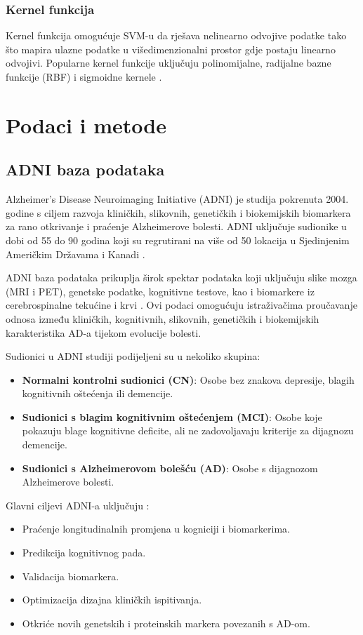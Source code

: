 \documentclass[zavrsnirad,upload]{fer}
\begin{document}
\subsection{Kernel funkcija}
Kernel funkcija omogućuje SVM-u da rješava nelinearno odvojive podatke tako što mapira ulazne podatke u višedimenzionalni prostor gdje postaju linearno odvojivi. Popularne kernel funkcije uključuju polinomijalne, radijalne bazne funkcije (RBF) i sigmoidne kernele \cite{Gammermann2000}.



\chapter{Podaci i metode}
\section{ADNI baza podataka}
Alzheimer's Disease Neuroimaging Initiative (ADNI) je studija pokrenuta 2004. godine s ciljem razvoja kliničkih, slikovnih, genetičkih i biokemijskih biomarkera za rano otkrivanje i praćenje Alzheimerove bolesti. ADNI uključuje sudionike u dobi od 55 do 90 godina koji su regrutirani na više od 50 lokacija u Sjedinjenim Američkim Državama i Kanadi \cite{adni_about}. 

ADNI baza podataka prikuplja širok spektar podataka koji uključuju slike mozga (MRI i PET), genetske podatke, kognitivne testove, kao i biomarkere iz cerebrospinalne tekućine i krvi \cite{adni_about}. Ovi podaci omogućuju istraživačima proučavanje odnosa između kliničkih, kognitivnih, slikovnih, genetičkih i biokemijskih karakteristika AD-a tijekom evolucije bolesti.

Sudionici u ADNI studiji podijeljeni su u nekoliko skupina:

\begin{itemize}
	\item \textbf{Normalni kontrolni sudionici (CN)}: Osobe bez znakova depresije, blagih kognitivnih oštećenja ili demencije.
	\item\textbf{Sudionici s blagim kognitivnim oštećenjem (MCI)}: Osobe koje pokazuju blage kognitivne deficite, ali ne zadovoljavaju kriterije za dijagnozu demencije.
	\item \textbf{Sudionici s Alzheimerovom bolešću (AD)}: Osobe s dijagnozom Alzheimerove bolesti.
\end{itemize}

Glavni ciljevi ADNI-a uključuju \cite{adni_about}:
\begin{itemize}
	\item Praćenje longitudinalnih promjena u kogniciji i biomarkerima.
	\item Predikcija kognitivnog pada.
	\item Validacija biomarkera.
	\item Optimizacija dizajna kliničkih ispitivanja.
	\item Otkriće novih genetskih i proteinskih markera povezanih s AD-om.
\end{itemize}
\end{document}

